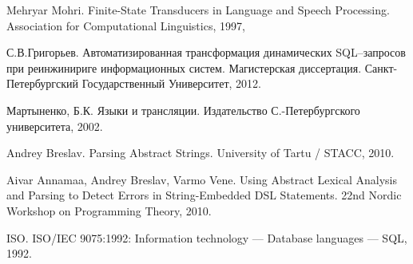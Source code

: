 \begin{thebibliography}{99}
Mehryar Mohri. Finite-State Transducers in Language and Speech Processing.
Association for Computational Linguistics, 1997,

С.В.Григорьев. Автоматизированная трансформация динамических SQL--запросов при реинжинириге информационных систем.
Магистерская диссертация. Санкт-Петербургский Государственный Университет, 2012.

Мартыненко, Б.К. Языки и трансляции. Издательство С.-Петербургского университета, 2002.

Andrey Breslav. Parsing Abstract Strings. University of Tartu / STACC, 2010.

Aivar Annamaa, Andrey Breslav, Varmo Vene.
Using Abstract Lexical Analysis and Parsing to Detect Errors in String-Embedded DSL Statements.
22nd Nordic Workshop on Programming Theory, 2010.

ISO. ISO/IEC 9075:1992: Information technology --- Database languages --- SQL, 1992.
\end{thebibliography}
